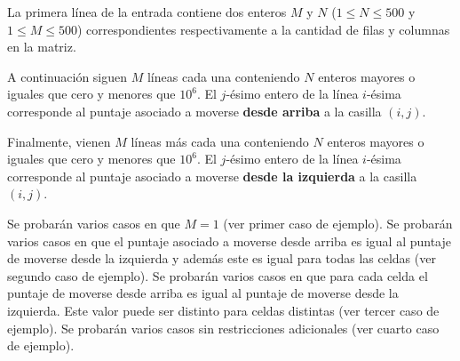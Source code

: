 \documentclass{oci}
\begin{document}
\begin{inputDescription}
  La primera línea de la entrada contiene dos enteros $M$ y $N$ ($1 \leq N \leq 500$ y $1 \leq M \leq 500$)
  correspondientes respectivamente a la cantidad de filas y columnas en la matriz.

  A continuación siguen $M$ líneas cada una conteniendo $N$ enteros mayores o iguales que cero y menores
  que $10^6$.
  El $j$-ésimo entero de la línea $i$-ésima corresponde al puntaje asociado a moverse {\bf desde arriba}
  a la casilla $(i, j)$.

  Finalmente, vienen $M$ líneas más cada una conteniendo $N$ enteros mayores o iguales que cero y menores
  que $10^6$.
  El $j$-ésimo entero de la línea $i$-ésima corresponde al puntaje asociado a moverse {\bf desde la izquierda}
  a la casilla $(i, j)$.
\end{inputDescription}

\begin{outputDescription}
\end{outputDescription}

\begin{scoreDescription}
  Se probarán varios casos en que $M=1$ (ver primer caso de ejemplo).
  Se probarán varios casos en que el puntaje asociado a moverse desde arriba es igual al puntaje
  de moverse desde la izquierda y además este es igual para todas las celdas
  (ver segundo caso de ejemplo).
  Se probarán varios casos en que para cada celda el puntaje de moverse desde arriba es igual al
  puntaje de moverse desde la izquierda. Este valor puede ser distinto para celdas distintas
  (ver tercer caso de ejemplo).
  Se probarán varios casos sin restricciones adicionales
  (ver cuarto caso de ejemplo).
\end{scoreDescription}

\begin{sampleDescription}
\end{sampleDescription}
\end{document}
